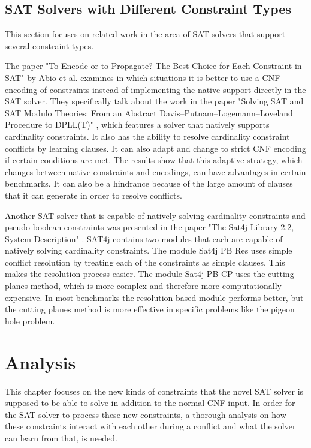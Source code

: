 \section{SAT Solvers with Different Constraint Types}
This section focuses on related work in the area of SAT solvers that support several constraint types.

The paper "To Encode or to Propagate? The Best Choice for Each Constraint in SAT" \cite{abio2013encode} by Abio et al. examines in which situations it is better to use a CNF encoding of constraints instead of implementing the native support directly in the SAT solver. They specifically talk about the work in the paper "Solving SAT and SAT Modulo Theories: From an Abstract
Davis–Putnam–Logemann–Loveland Procedure to DPLL(T)" \cite{nieuwenhuis2006solving}, which features a solver that natively supports cardinality constraints. It also has the ability to resolve cardinality constraint conflicts by learning clauses. It can also adapt and change to strict CNF encoding if certain conditions are met. The results show that this adaptive strategy, which changes between native constraints and encodings, can have advantages in certain benchmarks. It can also be a hindrance because of the large amount of clauses that it can generate in order to resolve conflicts.

Another SAT solver that is capable of natively solving cardinality constraints and pseudo-boolean constraints was presented in the paper "The Sat4j Library 2.2, System Description" \cite{le2010sat4j}. SAT4j contains two modules that each are capable of natively solving cardinality constraints. The module Sat4j PB Res uses simple conflict resolution by treating each of the constraints as simple clauses. This makes the resolution process easier. The module Sat4j PB CP uses the cutting planes method, which is more complex and therefore more computationally expensive. In most benchmarks the resolution based module performs better, but the cutting planes method is more effective in specific problems like the pigeon hole problem.

\chapter{Analysis}
\label{ch:Analysis}

This chapter focuses on the new kinds of constraints that the novel SAT solver is supposed to be able to solve in addition to the normal CNF input. In order for the SAT solver to process these new constraints, a thorough analysis on how these constraints interact with each other during a conflict and what the solver can learn from that, is needed.

